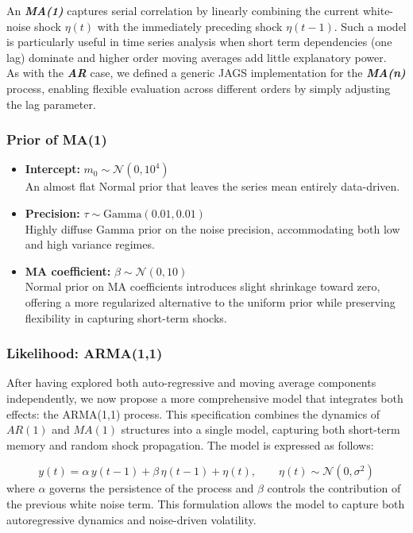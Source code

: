 \documentclass{Configuration_Files/PoliMi3i_thesis}
\begin{document}
An \textbf{\textit{MA(1)}} captures serial correlation by linearly combining the current white-noise shock \(\eta(t)\) with the immediately preceding shock \(\eta(t-1)\).  
Such a model is particularly useful in time series analysis when short term dependencies (one lag) dominate and higher order moving averages add little explanatory power.\\
As with the \textbf{\textit{AR}} case, we defined a generic JAGS implementation for the \textbf{\textit{MA(n)}} process, enabling flexible evaluation across different orders by simply adjusting the lag parameter.
\subsubsection{Prior of MA(1)}
\begin{itemize}
    \item \textbf{Intercept:} $m_0 \sim \mathcal{N}(0,10^4)$\\
    An almost flat Normal prior that leaves the series mean entirely data-driven.
    \item \textbf{Precision:} $\tau \sim \mathrm{Gamma}(0.01,0.01)$\\
    Highly diffuse Gamma prior on the noise precision, accommodating both low and high variance regimes.
    \item \textbf{MA coefficient:} $
\beta \sim \mathcal{N}\left(0, 10 \right)
$\\
Normal prior on MA coefficients introduces slight shrinkage toward zero, offering a more regularized alternative to the uniform prior while preserving flexibility in capturing short-term shocks.

\end{itemize}


\subsubsection{Likelihood: ARMA(1,1)}
After having explored both auto-regressive and moving average components independently, we now propose a more comprehensive model that integrates both effects: the ARMA(1,1) process. This specification combines the dynamics of $AR(1)$ and $MA(1)$ structures into a single model, capturing both short-term memory and random shock propagation. The model is expressed as follows:

\begin{equation}
y(t) = \alpha\, y(t-1) + \beta\, \eta(t-1) + \eta(t), \qquad \eta(t) \sim \mathcal{N}(0, \sigma^2)
\end{equation}
where $\alpha$ governs the persistence of the process and $\beta$ controls the contribution of the previous white noise term. This formulation allows the model to capture both autoregressive dynamics and noise-driven volatility.
\end{document}
